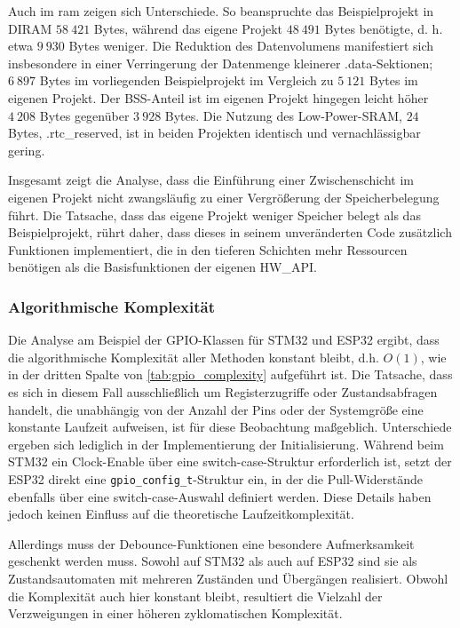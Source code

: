 Auch im \gls{ram} zeigen sich Unterschiede.
So beanspruchte das Beispielprojekt in DIRAM $58\ 421$ Bytes, während das eigene Projekt $48\ 491$ Bytes benötigte, d. h. etwa $9\ 930$ Bytes weniger. 
Die Reduktion des Datenvolumens manifestiert sich insbesondere in einer Verringerung der Datenmenge kleinerer .data-Sektionen; $6\ 897$ Bytes im vorliegenden Beispielprojekt im Vergleich zu $5\ 121$ Bytes im eigenen Projekt. 
Der BSS-Anteil ist im eigenen Projekt hingegen leicht höher $4\ 208$ Bytes gegenüber $3\ 928$ Bytes. 
Die Nutzung des Low-Power-SRAM, $24$ Bytes, .rtc\_reserved, ist in beiden Projekten identisch und vernachlässigbar gering.

Insgesamt zeigt die Analyse, dass die Einführung einer Zwischenschicht im eigenen Projekt nicht zwangsläufig zu einer Vergrößerung der Speicherbelegung führt.
Die Tatsache, dass das eigene Projekt weniger Speicher belegt als das Beispielprojekt, rührt daher, dass dieses in seinem unveränderten Code zusätzlich Funktionen implementiert, die in den tieferen Schichten mehr Ressourcen benötigen als die Basisfunktionen der eigenen HW\_API.

\subsubsection{Algorithmische Komplexität}
Die Analyse am Beispiel der GPIO-Klassen für STM32 und ESP32 ergibt, dass die algorithmische Komplexität aller Methoden konstant bleibt, d.h. $O(1)$, wie in der dritten Spalte von \cref{tab:gpio_complexity} aufgeführt ist.
Die Tatsache, dass es sich in diesem Fall ausschließlich um Registerzugriffe oder Zustandsabfragen handelt, die unabhängig von der Anzahl der Pins oder der Systemgröße eine konstante Laufzeit aufweisen, ist für diese Beobachtung maßgeblich. 
Unterschiede ergeben sich lediglich in der Implementierung der Initialisierung.
Während beim STM32 ein Clock-Enable über eine switch-case-Struktur erforderlich ist, setzt der ESP32 direkt eine \texttt{gpio\_config\_t}-Struktur ein, in der die Pull-Widerstände ebenfalls über eine switch-case-Auswahl definiert werden. 
Diese Details haben jedoch keinen Einfluss auf die theoretische Laufzeitkomplexität.

Allerdings muss der Debounce-Funktionen eine besondere Aufmerksamkeit geschenkt werden muss. 
Sowohl auf STM32 als auch auf ESP32 sind sie als Zustandsautomaten mit mehreren Zuständen und Übergängen realisiert.
Obwohl die Komplexität auch hier konstant bleibt, resultiert die Vielzahl der Verzweigungen in einer höheren zyklomatischen Komplexität.

